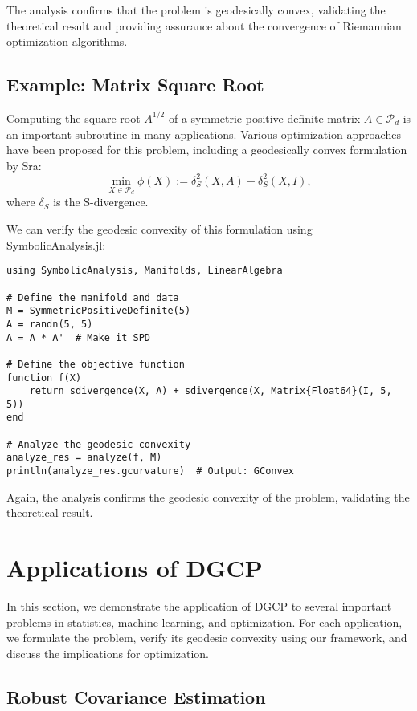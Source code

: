 The analysis confirms that the problem is geodesically convex, validating the theoretical result and providing assurance about the convergence of Riemannian optimization algorithms.

\subsection{Example: Matrix Square Root}

Computing the square root $A^{1/2}$ of a symmetric positive definite matrix $A \in \mathcal{P}_d$ is an important subroutine in many applications. Various optimization approaches have been proposed for this problem, including a geodesically convex formulation by Sra:
\begin{equation}
\min_{X \in \mathcal{P}_d} \phi(X) := \delta_S^2(X, A) + \delta_S^2(X, I),
\end{equation}
where $\delta_S$ is the S-divergence.

We can verify the geodesic convexity of this formulation using SymbolicAnalysis.jl:

\begin{verbatim}
using SymbolicAnalysis, Manifolds, LinearAlgebra

# Define the manifold and data
M = SymmetricPositiveDefinite(5)
A = randn(5, 5)
A = A * A'  # Make it SPD

# Define the objective function
function f(X)
    return sdivergence(X, A) + sdivergence(X, Matrix{Float64}(I, 5, 5))
end

# Analyze the geodesic convexity
analyze_res = analyze(f, M)
println(analyze_res.gcurvature)  # Output: GConvex
\end{verbatim}

Again, the analysis confirms the geodesic convexity of the problem, validating the theoretical result.

\section{Applications of DGCP}

In this section, we demonstrate the application of DGCP to several important problems in statistics, machine learning, and optimization. For each application, we formulate the problem, verify its geodesic convexity using our framework, and discuss the implications for optimization.

\subsection{Robust Covariance Estimation}


